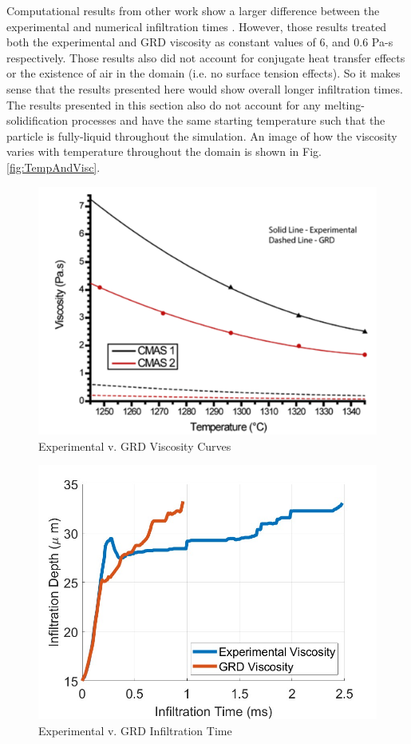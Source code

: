 \documentclass[conf]{new-aiaa}
\begin{document}
Computational results from other work show a larger difference between the experimental and numerical infiltration times \cite{Sirigiri2018}. However, those results treated both the experimental and GRD viscosity as constant values of 6, and 0.6 Pa-s respectively. Those results also did not account for conjugate heat transfer effects or the existence of air in the domain (i.e. no surface tension effects). So it makes sense that the results presented here would show overall longer infiltration times. The results presented in this section also do not account for any melting-solidification processes and have the same starting temperature such that the particle is fully-liquid throughout the simulation. An image of how the viscosity varies with temperature throughout the domain is shown in Fig. \ref{fig:TempAndVisc}.

\begin{figure}[htp!]
\centering
\includegraphics[width=.5\textwidth]{Figures/viscosity.png}
\caption{Experimental v. GRD Viscosity Curves}
\label{viscosity}
\end{figure}


\begin{figure}[htp!]
\centering
\includegraphics[width=.5\textwidth]{Figures/viscosity_v_time_curves.jpg}
\caption{Experimental v. GRD Infiltration Time}
\label{infilTimeVisc}
\end{figure}
\end{document}

